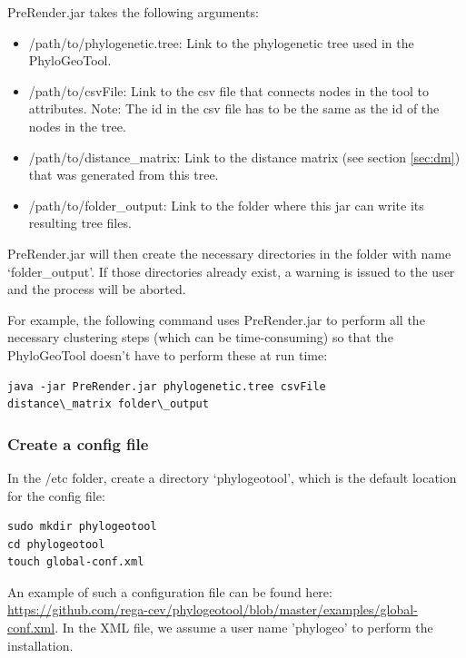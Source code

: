 \documentclass[a4paper, 11pt]{article} %
\begin{document}
PreRender.jar takes the following arguments: 
\begin{itemize}
\item /path/to/phylogenetic.tree: Link to the phylogenetic tree used in the PhyloGeoTool.
\item /path/to/csvFile: Link to the csv file that connects nodes in the tool to attributes. Note: The id in the csv file has to be the same as the id of the nodes in the tree.
\item /path/to/distance\_matrix: Link to the distance matrix (see section \ref{sec:dm}) that was generated from this tree.
\item /path/to/folder\_output: Link to the folder where this jar can write its resulting tree files.
\end{itemize}
PreRender.jar will then create the necessary directories in the folder with name `folder\_output'.
If those directories already exist, a warning is issued to the user and the process will be aborted.

For example, the following command uses PreRender.jar to perform all the necessary clustering steps (which can be time-consuming) so that the PhyloGeoTool doesn't have to perform these at run time: 
\begin{verbatim}
java -jar PreRender.jar phylogenetic.tree csvFile 
distance\_matrix folder\_output
\end{verbatim}


\subsubsection{Create a config file} \label{sssec:config_file}

In the /etc folder, create a directory `phylogeotool', which is the default location for the config file:
\begin{verbatim}
sudo mkdir phylogeotool
cd phylogeotool
touch global-conf.xml
\end{verbatim}

An example of such a configuration file can be found here: \url{https://github.com/rega-cev/phylogeotool/blob/master/examples/global-conf.xml}.
In the XML file, we assume a user name 'phylogeo' to perform the installation.
\end{document}
